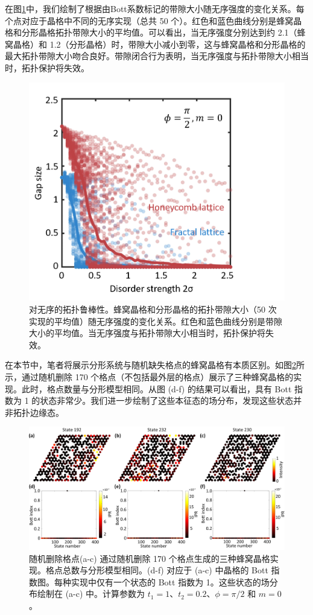 在图\ref{fig:Robust}中，我们绘制了根据由Bott系数标记的带隙大小随无序强度的变化关系。每个点对应于晶格中不同的无序实现（总共 50 个）。红色和蓝色曲线分别是蜂窝晶格和分形晶格拓扑带隙大小的平均值。可以看出，当无序强度分别达到约 2.1（蜂窝晶格）和 1.2（分形晶格）时，带隙大小减小到零，这与蜂窝晶格和分形晶格的最大拓扑带隙大小吻合良好。带隙闭合行为表明，当无序强度与拓扑带隙大小相当时，拓扑保护将失效。

\begin{figure}[htbp]
    \centering
    \includegraphics[width=0.5\linewidth]{figure/FracHaldTheo/Robust.png}
    \caption{对无序的拓扑鲁棒性。蜂窝晶格和分形晶格的拓扑带隙大小（50 次实现的平均值）随无序强度的变化关系。红色和蓝色曲线分别是带隙大小的平均值。当无序强度与拓扑带隙大小相当时，拓扑保护将失效。}
    \label{fig:Robust}
\end{figure}

在本节中，笔者将展示分形系统与随机缺失格点的蜂窝晶格有本质区别。如图\ref{fig:HaldRandDel}所示，通过随机删除 170 个格点（不包括最外层的格点）展示了三种蜂窝晶格的实现。此时，格点数量与分形模型相同。从图 (d-f) 的结果可以看出，具有 Bott 指数为 1 的状态非常少。我们进一步绘制了这些本征态的场分布，发现这些状态并非拓扑边缘态。

\begin{figure}[h]
    \centering
    \includegraphics[width=0.8\linewidth]{figure/FracHaldTheo/RandDel.png}
    \caption{随机删除格点(a-c) 通过随机删除 170 个格点生成的三种蜂窝晶格实现。格点总数与分形模型相同。(d-f) 对应于 (a-c) 中晶格的 Bott 指数图。每种实现中仅有一个状态的 Bott 指数为 1。这些状态的场分布绘制在 (a-c) 中。计算参数为 $t_1 = 1$、$t_2 = 0.2$、$\phi = \pi/2$ 和 $m = 0$。}
    \label{fig:HaldRandDel}
\end{figure}


